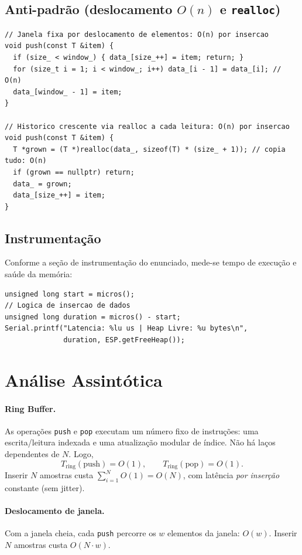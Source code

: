 \documentclass[11pt,a4paper]{article}
\begin{document}
\subsection{Anti-padrão (deslocamento $O(n)$ e \texttt{realloc})}
\begin{lstlisting}
// Janela fixa por deslocamento de elementos: O(n) por insercao
void push(const T &item) {
  if (size_ < window_) { data_[size_++] = item; return; }
  for (size_t i = 1; i < window_; i++) data_[i - 1] = data_[i]; // O(n)
  data_[window_ - 1] = item;
}

// Historico crescente via realloc a cada leitura: O(n) por insercao
void push(const T &item) {
  T *grown = (T *)realloc(data_, sizeof(T) * (size_ + 1)); // copia tudo: O(n)
  if (grown == nullptr) return;
  data_ = grown;
  data_[size_++] = item;
}
\end{lstlisting}

\subsection{Instrumentação}
Conforme a seção de instrumentação do enunciado, mede-se tempo de execução e
saúde da memória:
\begin{lstlisting}
unsigned long start = micros();
// Logica de insercao de dados
unsigned long duration = micros() - start;
Serial.printf("Latencia: %lu us | Heap Livre: %u bytes\n",
              duration, ESP.getFreeHeap());
\end{lstlisting}

\section{Análise Assintótica}

\paragraph{Ring Buffer.} As operações \texttt{push} e \texttt{pop} executam um
número fixo de instruções: uma escrita/leitura indexada e uma atualização
modular de índice. Não há laços dependentes de $N$. Logo,
\[
T_{\text{ring}}(\text{push}) = O(1), \qquad
T_{\text{ring}}(\text{pop}) = O(1).
\]
Inserir $N$ amostras custa $\sum_{i=1}^{N} O(1) = O(N)$, com latência
\emph{por inserção} constante (sem jitter).

\paragraph{Deslocamento de janela.} Com a janela cheia, cada \texttt{push}
percorre os $w$ elementos da janela: $O(w)$. Inserir $N$ amostras custa
$O(N \cdot w)$.
\end{document}
